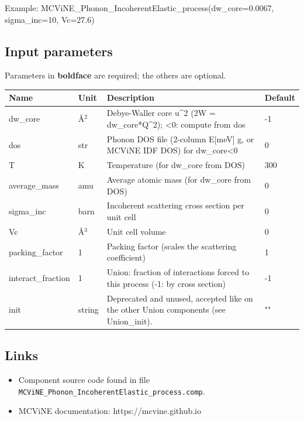 Example: MCViNE\_Phonon\_IncoherentElastic\_process(dw\_core=0.0067, sigma\_inc=10, Vc=27.6)

\subsection*{Input parameters}
Parameters in \textbf{boldface} are required; the others are optional.

\begin{longtable}{p{}p{}p{}p{}}
\toprule
\textbf{Name} & \textbf{Unit} & \textbf{Description} & \textbf{Default} \\
\midrule
\endhead
dw\_core & \AA{}$^{2}$ & Debye-Waller core u\textasciicircum{}2 (2W = dw\_core*Q\textasciicircum{}2); \textless{}0: compute from dos & -1 \\
dos & str & Phonon DOS file (2-column E[meV] g, or MCViNE IDF DOS) for dw\_core\textless{}0 & 0 \\
T & K & Temperature (for dw\_core from DOS) & 300 \\
average\_mass & amu & Average atomic mass (for dw\_core from DOS) & 0 \\
sigma\_inc & barn & Incoherent scattering cross section per unit cell & 0 \\
Vc & \AA{}$^{3}$ & Unit cell volume & 0 \\
packing\_factor & 1 & Packing factor (scales the scattering coefficient) & 1 \\
interact\_fraction & 1 & Union: fraction of interactions forced to this process (-1: by cross section) & -1 \\
init & string & Deprecated and unused, accepted like on the other Union components (see Union\_init). & "" \\
\bottomrule
\end{longtable}

\subsection*{Links}
\begin{itemize}
  \item Component source code found in file \texttt{MCViNE\_Phonon\_IncoherentElastic\_process.comp}.
  \item MCViNE documentation: https://mcvine.github.io
\end{itemize}
